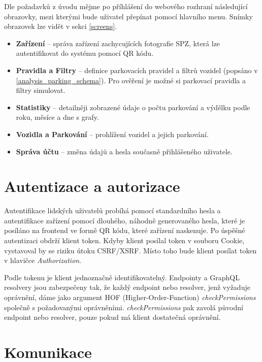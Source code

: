 \noindent
Dle požadavků z úvodu mějme po příhlášení do webového rozhraní následující obrazovky,
mezi kterými bude uživatel přepínat pomocí hlavního menu.
Snímky obrazovek lze vidět v sekci \ref{screens}.

\begin{itemize}
  \setlength\itemsep{.05em}
  \item \textbf{Zařízení} -- správa zařízení zachycujících fotografie SPZ, která lze autentifikovat do systému pomocí
        QR kódu.
  \item \textbf{Pravidla a Filtry} -- definice parkovacích pravidel a filtrů vozidel (popsáno v \ref{analysis_parking_schema}).
        Pro ověření je možné si parkovací pravidla a filtry simulovat.
  \item \textbf{Statistiky} -- detailněji zobrazené údaje o počtu parkování a výdělku podle roku, měsíce a dne s grafy.
  \item \textbf{Vozidla a Parkování} -- prohlížení vozidel a jejich parkování.
  \item \textbf{Správa účtu} -- změna údajů a hesla současně přihlášeného uživatele.
\end{itemize}

\section{Autentizace a autorizace} \label{auther_authen}

\noindent
Autentifikace lidských uživatelů probíhá pomocí standardního hesla a autentifikace zařízení pomocí dlouhého,
náhodně generovaného hesla,
které je posíláno na frontend ve formě QR kódu, které zařízení naskenuje.
Po úspěšné autentizaci obdrží klient token.
Kdyby klient posílal token v souboru Cookie, vystavoval by se riziku útoku CSRF/XSRF.
Místo toho bude klient posílat token v hlavičce \textit{Authorization}.

Podle tokenu je klient jednoznačně identifikovatelný. Endpointy a GraphQL resolvery jsou zabezpečeny tak,
že každý endpoint nebo resolver, jenž vyžaduje oprávnění, dáme jako argument HOF (Higher-Order-Function)
\textit{checkPermissions} společně s požadovanými oprávněními. \textit{checkPermissions} pak zavolá původní
endpoint nebo resolver, pouze pokud má klient dostatečná oprávnění.

\section{Komunikace}

